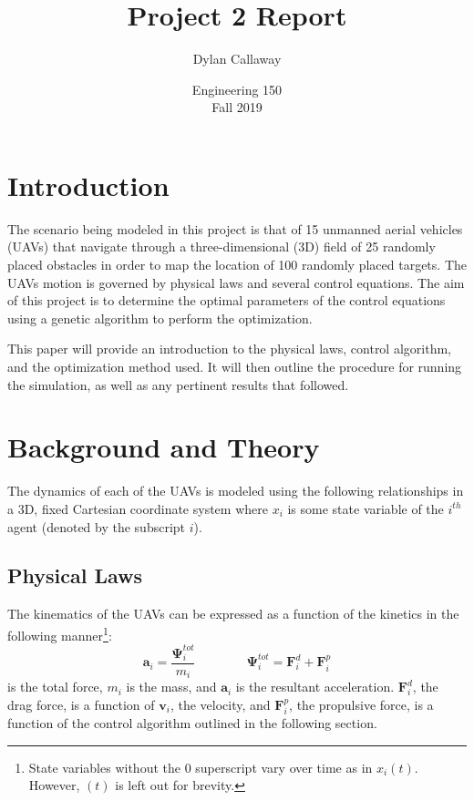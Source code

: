 \documentclass[a4paper,12pt]{report}
\begin{document}
\setlength{\abovedisplayskip}{6pt}
\setlength{\belowdisplayskip}{8pt}
\setlength{\abovedisplayshortskip}{2pt}
\setlength{\belowdisplayshortskip}{8pt}

\title{Project 2 Report}
\author{Dylan Callaway}
\date{Engineering 150 \\ Fall 2019}
\maketitle

\tableofcontents
\newpage
{}

\newenvironment{nscenter}
 {\setlength{\topsep}{0ex}\trivlist\item\relax\centering}
 {\endtrivlist}

\section{Introduction}
The scenario being modeled in this project is that of 15 unmanned aerial vehicles (UAVs) that navigate through a three-dimensional (3D) field of 25 randomly placed obstacles in order to map the location of 100 randomly placed targets. The UAVs motion is governed by physical laws and several control equations. The aim of this project is to determine the optimal parameters of the control equations using a genetic algorithm to perform the optimization.

This paper will provide an introduction to the physical laws, control algorithm, and the optimization method used. It will then outline the procedure for running the simulation, as well as any pertinent results that followed.


\section{Background and Theory}
The dynamics of each of the UAVs is modeled using the following relationships in a 3D, fixed Cartesian coordinate system where $x_i$ is some state variable of the $i^{th}$ agent (denoted by the subscript $i$).

\subsection{Physical Laws}
The kinematics of the UAVs can be expressed as a function of the kinetics in the following manner\footnote{State variables without the $0$ superscript vary over time as in $x_i(t)$. However, $(t)$ is left out for brevity.}:
$$\bm{a}_i = \frac{\bm{\Psi}^{tot}_i}{m_i} \qquad \qquad \bm{\Psi}^{tot}_i = \bm{F}^d_i +\bm{F}^p_i$$
is the total force, $m_i$ is the mass, and $\bm{a}_i$ is the resultant acceleration. $\bm{F}^d_i$, the drag force, is a function of $\bm{v}_i$, the velocity, and $\bm{F}^p_i$, the propulsive force, is a function of the control algorithm outlined in the following section.
 
\end{document}
